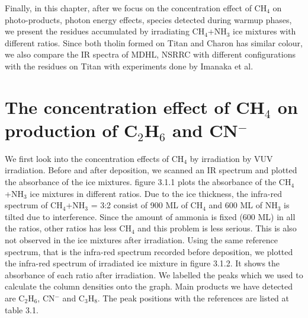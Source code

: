 Finally, in this chapter, after we focus on the concentration effect of CH$_4$ on photo-products, photon energy effects, species detected during warmup phases, we present the residues accumulated by irradiating CH$_4$+NH$_3$ ice mixtures with different ratios. Since both tholin formed on Titan and Charon has similar colour, we also compare the IR spectra of MDHL, NSRRC with different configurations with the residues on Titan with experiments done by Imanaka et al.\\
\section{The concentration effect of CH$_4$ on production of C$_2$H$_6$ and CN$^-$}
We first look into the concentration effects of CH$_4$ by irradiation by VUV irradiation. Before and after deposition, we scanned an IR spectrum and plotted the absorbance of the ice mixtures. figure 3.1.1 plots the absorbance of the CH$_4$+NH$_3$ ice mixtures in different ratios. Due to the ice thickness, the infra-red spectrum of CH$_4$+NH$_3$ = 3:2 consist of 900 ML of CH$_4$ and 600 ML of NH$_3$ is tilted due to interference. Since the amount of ammonia is fixed (600 ML) in all the ratios, other ratios has less CH$_4$ and this problem is less serious. This is also not observed in the ice mixtures after irradiation. Using the same reference spectrum, that is the infra-red spectrum recorded before deposition, we plotted the infra-red spectrum of irradiated ice mixture in figure 3.1.2. It shows the absorbance of each ratio after irradiation. We labelled the peaks which we used to calculate the column densities onto the graph. Main products we have detected are C$_2$H$_6$, CN$^-$ and C$_3$H$_8$. The peak positions with the references are listed at table 3.1.

